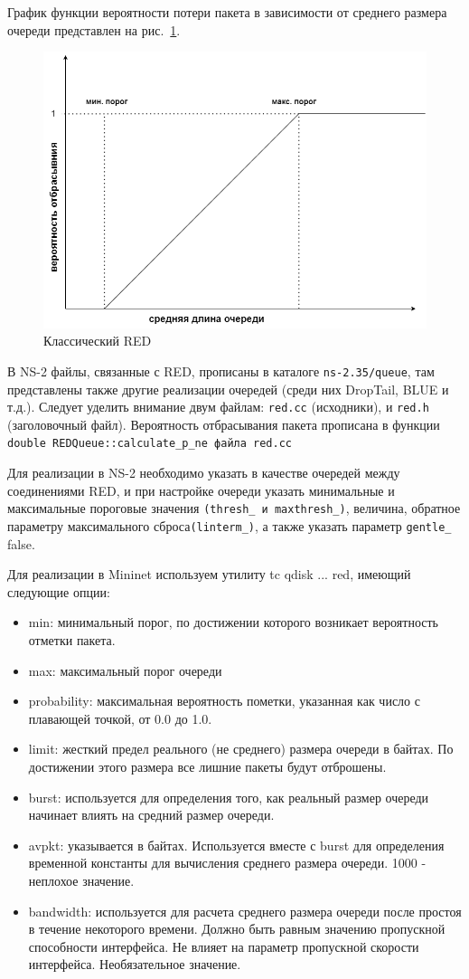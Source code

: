 График функции вероятности потери пакета в зависимости от среднего
размера очереди представлен на рис.~\ref{fig:2.1}.

\begin{figure}[!h]
  \centering
  \includegraphics[width=0.7\linewidth]{image/red.png}
  \caption{Классический RED}
  \label{fig:2.1}
\end{figure}


В NS-2 файлы, связанные с RED, прописаны в каталоге
\verb|ns-2.35/queue|, там представлены также другие реализации
очередей (среди них DropTail, BLUE и т.д.). Следует уделить внимание
двум файлам: \verb|red.cc| (исходники), и \verb|red.h| (заголовочный
файл). Вероятность отбрасывания пакета прописана в функции 
\verb|double REDQueue::calculate_p_ne файла red.cc|

Для реализации в NS-2 необходимо указать в качестве очередей между соединениями
RED, и при настройке очереди указать минимальные и максимальные пороговые значения 
\verb|(thresh_ и maxthresh_)|, величина, обратное параметру максимального сброса\verb|(linterm_)|, 
а также указать параметр \verb|gentle_| false.

Для реализации в Mininet используем утилиту tc qdisk ... red, имеющий следующие опции:
\begin{itemize}
\item min: минимальный порог, по достижении которого возникает вероятность отметки пакета.
\item max: максимальный порог очереди
\item probability: максимальная вероятность пометки, указанная как число с плавающей точкой, от 0.0 до 1.0. 
\item limit: жесткий предел реального (не среднего) размера очереди в байтах. По достижении этого размера все лишние пакеты будут отброшены.
\item burst: используется для определения того, как реальный размер очереди начинает влиять на средний размер очереди. 
\item avpkt: указывается в байтах. Используется вместе с burst для определения временной константы для вычисления среднего размера очереди. 1000 - неплохое значение.
\item bandwidth: используется для расчета среднего размера очереди после простоя в течение некоторого времени. Должно быть равным значению пропускной способности интерфейса. Не влияет на параметр пропускной скорости интерфейса. Необязательное значение.

\end{itemize}

